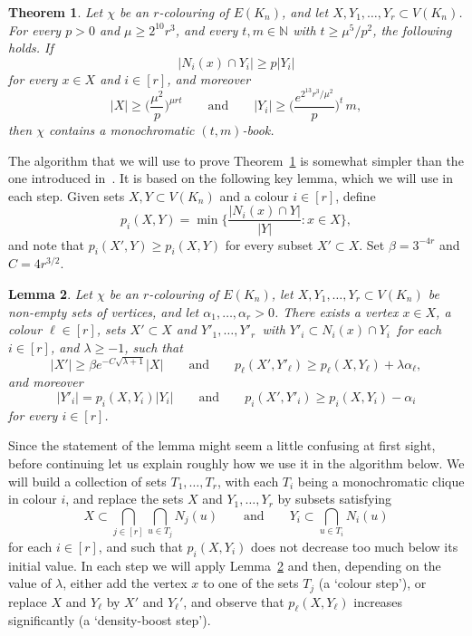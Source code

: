 \documentclass[12pt,reqno]{amsart}
\newtheorem{theorem}{Theorem}[section]
\newtheorem{lemma}[theorem]{Lemma}
\theoremstyle{definition}
\theoremstyle{remark}
\newcommand\N{\mathbb{N}}
\renewcommand{\ge}{\geqslant}
\def\N{\mathbb{N}}
\begin{document}
\begin{theorem}\label{thm:book}
Let\/ $\chi$ be an\/ $r$-colouring of\/ $E(K_n)$, and let\/ $X,Y_1,\ldots,Y_r \subset V(K_n)$. %
For every $p > 0$ and $\mu \ge 2^{10} r^3$, and every $t,m \in \N$ with $t \ge \mu^5 / p^2$, the following holds. If 
$$|N_i(x) \cap Y_i| \ge p|Y_i|$$
for every $x \in X$ and $i \in [r]$, and moreover
$$|X| \ge \bigg( \frac{\mu^2}{p} \bigg)^{\mu r t} \qquad \text{and} \qquad |Y_i| \ge \bigg( \frac{e^{2^{13} r^3 / \mu^2}}{p} \bigg)^t \, m,$$ 
then $\chi$ contains a monochromatic $(t,m)$-book.
\end{theorem}


The algorithm that we will use to prove Theorem~\ref{thm:book} is somewhat simpler than the one introduced in~\cite{CGMS}. It is based on the following key lemma, which we will use in each step. Given sets $X,Y \subset V(K_n)$ and a colour $i \in [r]$, define 
$$p_i(X,Y) = \min\bigg\{ \frac{|N_i(x) \cap Y|}{|Y|} : x \in X \bigg\},$$
and note that $p_i(X',Y) \ge p_i(X,Y)$ for every subset $X' \subset X$. Set $\beta = 3^{-4r}$ and $C = 4r^{3/2}$.
 
\begin{lemma}\label{key:lemma}
Let\/ $\chi$ be an\/ $r$-colouring of\/ $E(K_n)$, let\/ $X,Y_1,\ldots,Y_r \subset V(K_n)$ be non-empty sets of vertices, and let $\alpha_1,\ldots,\alpha_r > 0$. There exists a vertex $x \in X$, a colour $\ell \in [r]$, sets $X' \subset X$ and\/ $Y'_1,\ldots,Y'_r\,$ with\/ $Y'_i \subset N_i(x) \cap Y_i\,$ for each $i \in [r]$, and\/ $\lambda \ge -1$, such that 
\begin{equation}\label{eq:key:ell}
|X'| \ge \beta e^{- C \sqrt{\lambda + 1}} |X| \qquad \text{and} \qquad p_\ell( X', Y'_\ell ) \ge p_\ell(X,Y_\ell) + \lambda \alpha_\ell,
\end{equation}
and moreover
\begin{equation}\label{eq:key:alli}
|Y'_i| = p_i(X,Y_i) |Y_i| \qquad \text{and} \qquad p_i( X', Y'_i ) \ge p_i(X,Y_i) - \alpha_i
\end{equation}
for every $i \in [r]$.
\end{lemma}

Since the statement of the lemma might seem a little confusing at first sight, before continuing let us explain roughly how we use it in the algorithm below. We will build a collection of sets $T_1,\ldots,T_r$, with each $T_i$ being a monochromatic clique in colour $i$, and replace the sets $X$ and $Y_1,\ldots,Y_r$ by subsets satisfying
$$X \subset \bigcap_{j \in [r]} \bigcap_{u \in T_j} N_j(u) \qquad \text{and} \qquad Y_i \subset \bigcap_{u \in T_i} N_i(u)$$
for each $i \in [r]$, and such that $p_i(X,Y_i)$ does not decrease too much below its initial value. In each step we will apply Lemma~\ref{key:lemma} and then, depending on the value of $\lambda$, either add the vertex $x$ to one of the sets $T_j$ (a `colour step'), or replace $X$ and $Y_\ell$ by $X'$ and $Y_\ell'$, and observe that $p_\ell(X,Y_\ell)$ increases significantly (a `density-boost step'). 
\end{document}

